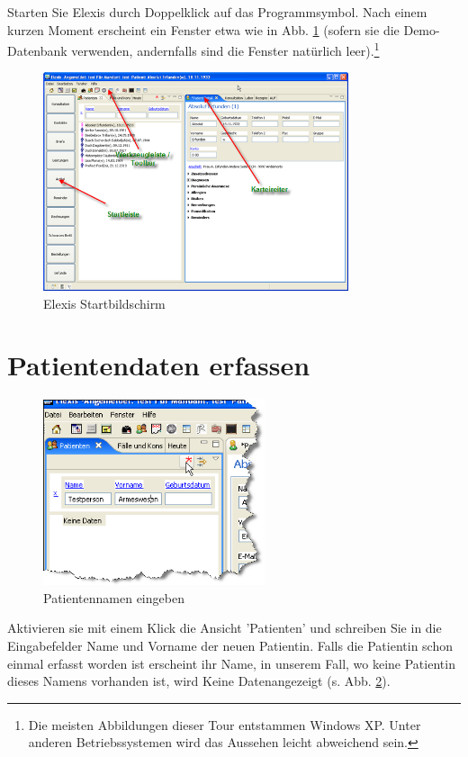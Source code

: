 
Starten Sie Elexis durch Doppelklick auf das Programmsymbol.
Nach einem kurzen Moment erscheint ein Fenster etwa wie in Abb. \ref{fig:startbild} (sofern sie die
Demo-Datenbank verwenden, andernfalls sind die Fenster natürlich
leer).\footnote{Die meisten Abbildungen dieser Tour entstammen Windows XP. Unter anderen Betriebssystemen wird das Aussehen leicht abweichend sein.}
 \begin{figure}[ht]
	\includegraphics[width=0.8\textwidth]{images/einf0}
	\caption{Elexis Startbildschirm}
	\label{fig:startbild}
\end{figure}
\section{Patientendaten erfassen}
\begin{figure}
	\includegraphics[width=6.5cm]{images/einf1}
	\caption{Patientennamen eingeben}\label{fig:patname}
\end{figure}
Aktivieren sie mit einem Klick die Ansicht 'Patienten' und schreiben Sie in die Eingabefelder Name und Vorname der neuen Patientin.
Falls die Patientin schon einmal erfasst worden ist erscheint ihr Name, in unserem Fall, wo keine Patientin dieses Namens vorhanden ist, wird \glqq Keine Daten\grqq{}angezeigt (s. Abb. \ref{fig:patname}).


